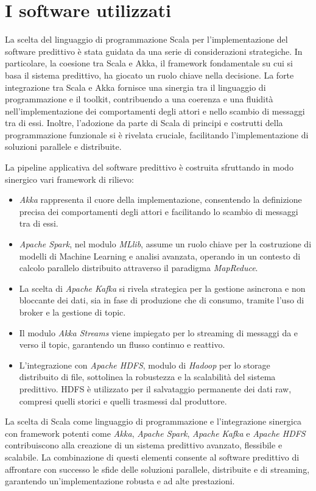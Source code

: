 \section[Software utilizzati]{I software utilizzati}
La scelta del linguaggio di programmazione Scala per l'implementazione del software predittivo è stata guidata da una serie di considerazioni strategiche.
In particolare, la coesione tra Scala e Akka, il framework fondamentale su cui si basa il sistema predittivo, ha giocato un ruolo chiave nella decisione.
La forte integrazione tra Scala e Akka fornisce una sinergia tra il linguaggio di programmazione e il toolkit, contribuendo a una coerenza e una fluidità nell'implementazione dei comportamenti degli attori e nello scambio di messaggi tra di essi.
Inoltre, l'adozione da parte di Scala di principi e costrutti della programmazione funzionale si è rivelata cruciale, facilitando l'implementazione di soluzioni parallele e distribuite.

La pipeline applicativa del software predittivo è costruita sfruttando in modo sinergico vari framework di rilievo: 
\begin{itemize}
    \item \textit{Akka} rappresenta il cuore della implementazione, consentendo la definizione precisa dei comportamenti degli attori e facilitando lo scambio di messaggi tra di essi. 
    \item \textit{Apache Spark}, nel modulo \textit{MLlib}, assume un ruolo chiave per la costruzione di modelli di Machine Learning e analisi avanzata, operando in un contesto di calcolo parallelo distribuito attraverso il paradigma \textit{MapReduce}.
    \item La scelta di \textit{Apache Kafka} si rivela strategica per la gestione asincrona e non bloccante dei dati, sia in fase di produzione che di consumo, tramite l'uso di broker e la gestione di topic.
    \item Il modulo \textit{Akka Streams} viene impiegato per lo streaming di messaggi da e verso il topic, garantendo un flusso continuo e reattivo.
    \item L'integrazione con \textit{Apache HDFS}, modulo di \textit{Hadoop} per lo storage distribuito di file, sottolinea la robustezza e la scalabilità del sistema predittivo. HDFS è utilizzato per il salvataggio permanente dei dati raw, compresi quelli storici e quelli trasmessi dal produttore.
\end{itemize}
La scelta di Scala come linguaggio di programmazione e l'integrazione sinergica con framework potenti come \textit{Akka}, \textit{Apache Spark}, \textit{Apache Kafka} e \textit{Apache HDFS} contribuiscono alla creazione di un sistema predittivo avanzato, flessibile e scalabile.
La combinazione di questi elementi consente al software predittivo di affrontare con successo le sfide delle soluzioni parallele, distribuite e di streaming, garantendo un'implementazione robusta e ad alte prestazioni.

